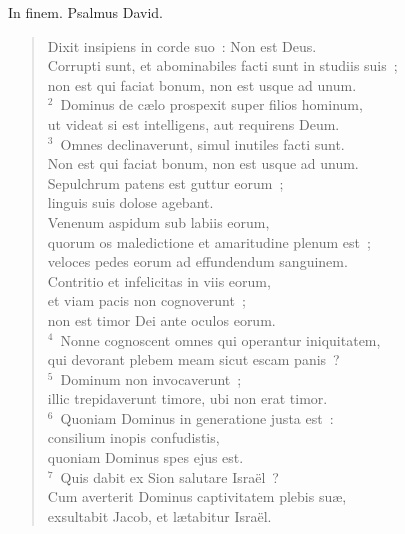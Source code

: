 \lettrine[lines=3,image=true,loversize=0.05,lraise=-0.03]{I}{}n finem. Psalmus David. \begin{flushleft}\begin{verse}\vspace{6pt}Dixit insipiens in corde suo~: Non est Deus.\\ Corrupti sunt, et abominabiles facti sunt in studiis suis~;\\ non est qui faciat bonum, non est usque ad unum.\\
${}^{2}$~Dominus de c\ae lo prospexit super filios hominum,\\ ut videat si est intelligens, aut requirens Deum.\\
${}^{3}$~Omnes declinaverunt, simul inutiles facti sunt.\\ Non est qui faciat bonum, non est usque ad unum.\\ Sepulchrum patens est guttur eorum~;\\ linguis suis dolose agebant.\\ Venenum aspidum sub labiis eorum,\\ quorum os maledictione et amaritudine plenum est~;\\ veloces pedes eorum ad effundendum sanguinem.\\ Contritio et infelicitas in viis eorum,\\ et viam pacis non cognoverunt~;\\ non est timor Dei ante oculos eorum.\\
${}^{4}$~Nonne cognoscent omnes qui operantur iniquitatem,\\ qui devorant plebem meam sicut escam panis~?\\
${}^{5}$~Dominum non invocaverunt~;\\ illic trepidaverunt timore, ubi non erat timor.\\
${}^{6}$~Quoniam Dominus in generatione justa est~:\\ consilium inopis confudistis,\\ quoniam Dominus spes ejus est.\\
${}^{7}$~Quis dabit ex Sion salutare Isra\"el~?\\ Cum averterit Dominus captivitatem plebis su\ae ,\\ exsultabit Jacob, et l\ae tabitur Isra\"el.\end{verse}\end{flushleft}



